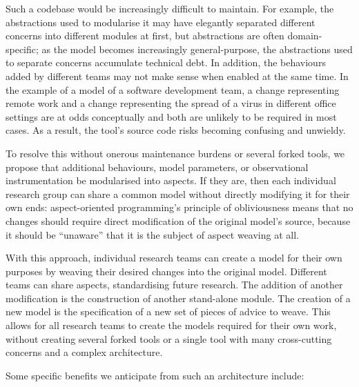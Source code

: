 Such a codebase would be increasingly difficult to maintain. For example, the
abstractions used to modularise it may have elegantly separated different
concerns into different modules at first, but abstractions are often
domain-specific; as the model becomes increasingly general-purpose, the
abstractions used to separate concerns accumulate technical debt. In addition,
the behaviours added by different teams may not make sense when enabled at the
same time. In the example of a model of a software development team, a change
representing remote work and a change representing the spread of a virus in
different office settings are at odds conceptually and both are unlikely to be
required in most cases. As a result, the tool's source code risks becoming
confusing and unwieldy.

To resolve this without onerous maintenance burdens or several forked tools, we
propose that additional behaviours, model parameters, or observational
instrumentation be modularised into aspects. If they are, then each individual
research group can share a common model without directly modifying it for their
own ends: aspect-oriented programming's principle of obliviousness means that no
changes should require direct modification of the original model's source,
because it should be ``unaware'' that it is the subject of aspect weaving at
all.

With this approach, individual research teams can create a model for their own
purposes by weaving their desired changes into the original model. Different
teams can share aspects, standardising future research. The addition of another
modification is the construction of another stand-alone module. The creation of
a new model is the specification of a new set of pieces of advice to weave. This
allows for all research teams to create the models required for their own work,
without creating several forked tools or a single tool with many cross-cutting
concerns and a complex architecture.

Some specific benefits we anticipate from such an architecture include:

